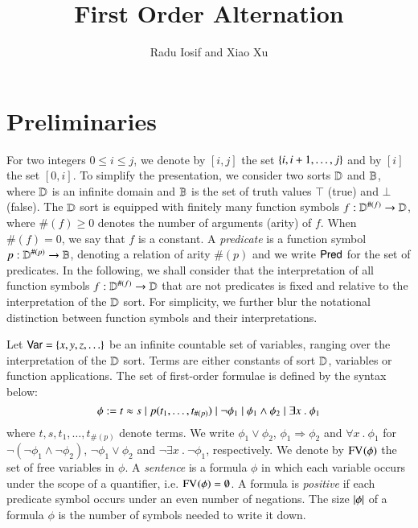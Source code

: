 \documentclass{llncs}
\begin{document}

\title{First Order Alternation}

\author{Radu Iosif and Xiao Xu}

\maketitle

\begin{abstract}
\end{abstract}

\section{Preliminaries}

For two integers $0 \leq i \leq j$, we denote by $[i,j]$ the set
$\{ i,i+1,\ldots,j \}$ and by $[i]$ the set $[0,i]$. To simplify the
presentation, we consider two sorts $\mathbb{D}$ and $\mathbb{B}$, where $\mathbb{D}$
is an infinite domain and $\mathbb{B}$ is the set of truth values $\top$
(true) and $\bot$ (false). The $\mathbb{D}$ sort is equipped with finitely
many function symbols $f : \mathbb{D}^{\#(f)} \rightarrow \mathbb{D}$, where
$\#(f)\geq0$ denotes the number of arguments (arity) of $f$. When
$\#(f)=0$, we say that $f$ is a constant. A \emph{predicate} is a
function symbol $p : \mathbb{D}^{\#(p)} \rightarrow \mathbb{B}$, denoting a
relation of arity $\#(p)$ and we write $\mathsf{Pred}$ for the set of
predicates. In the following, we shall consider that the
interpretation of all function symbols $f : \mathbb{D}^{\#(f)} \rightarrow
\mathbb{D}$ that are not predicates is fixed and relative to the
interpretation of the $\mathbb{D}$ sort. For simplicity, we further blur
the notational distinction between function symbols and their
interpretations.

Let $\mathsf{Var} = \{ x,y,z,\ldots \}$ be an infinite countable set of
variables, ranging over the interpretation of the $\mathbb{D}$ sort. Terms
are either constants of sort $\mathbb{D}$, variables or function
applications. The set of first-order formulae is defined by the syntax
below:
\[\phi := t \approx s \mid p(t_1,\ldots,t_{\#(p)}) 
\mid \neg \phi_1 \mid \phi_1 \wedge \phi_2 \mid \exists x ~.~
\phi_1 \] where $t,s,t_1,\ldots,t_{\#(p)}$ denote terms. We write
$\phi_1 \vee \phi_2$, $\phi_1 \Rightarrow \phi_2$ and $\forall x ~.~
\phi_1$ for $\neg(\neg\phi_1 \wedge \neg\phi_2)$, $\neg\phi_1 \vee
\phi_2$ and $\neg\exists x ~.~ \neg\phi_1$, respectively. We denote by
$\mathrm{FV}_{}(\phi)$ the set of free variables in $\phi$. A \emph{sentence}
is a formula $\phi$ in which each variable occurs under the scope of a
quantifier, i.e. $\mathrm{FV}_{}(\phi) = \emptyset$. A formula is
\emph{positive} if each predicate symbol occurs under an even number
of negations. The size ${|{\phi}|}$ of a formula $\phi$ is the number
of symbols needed to write it down.
\end{document}
